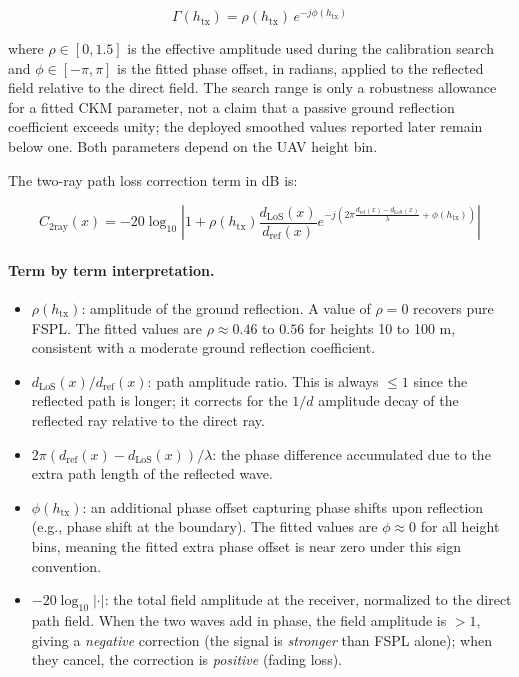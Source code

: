 \begin{equation}
\Gamma(h_{\mathrm{tx}})
=
\rho(h_{\mathrm{tx}})\,e^{-j\phi(h_{\mathrm{tx}})}
\end{equation}

where $\rho \in [0, 1.5]$ is the effective amplitude used during the
calibration search and $\phi \in [-\pi,\pi]$ is the fitted phase offset, in
radians, applied to the reflected field relative to the direct field.
The search range is only a robustness allowance for a fitted CKM parameter, not
a claim that a passive ground reflection coefficient exceeds unity; the
deployed smoothed values reported later remain below one.
Both parameters depend on the UAV height bin.

The two-ray path loss correction term in dB is:

\begin{equation}
C_{\mathrm{2ray}}(x)
=
-20 \log_{10}
\left|
1 + \rho(h_{\mathrm{tx}})
\frac{d_{\mathrm{LoS}}(x)}{d_{\mathrm{ref}}(x)}
e^{-j\left(2\pi\frac{d_{\mathrm{ref}}(x)-d_{\mathrm{LoS}}(x)}{\lambda}+\phi(h_{\mathrm{tx}})\right)}
\right|
\label{eq:c2ray}
\end{equation}

\paragraph{Term by term interpretation.}
\begin{itemize}
\item $\rho(h_{\mathrm{tx}})$: amplitude of the ground reflection. A value of
      $\rho = 0$ recovers pure FSPL. The fitted values are $\rho \approx
      0.46$ to $0.56$ for heights 10 to 100 m, consistent with a moderate
      ground reflection coefficient.
\item $d_{\mathrm{LoS}}(x)/d_{\mathrm{ref}}(x)$: path amplitude ratio. This
      is always $\le 1$ since the reflected path is longer; it corrects for
      the $1/d$ amplitude decay of the reflected ray relative to the direct
      ray.
\item \(2\pi(d_{\mathrm{ref}}(x)-d_{\mathrm{LoS}}(x))/\lambda\): the phase
      difference accumulated due to the extra path length of the reflected
      wave.
\item $\phi(h_{\mathrm{tx}})$: an additional phase offset capturing phase
      shifts upon reflection (e.g., phase shift at the boundary). The fitted
      values are $\phi \approx 0$ for all height bins, meaning the fitted
      extra phase offset is near zero under this sign convention.
\item $-20\log_{10}|\cdot|$: the total field amplitude at the receiver,
      normalized to the direct path field. When the two waves add in phase, the
      field amplitude is $> 1$, giving a \emph{negative} correction (the signal
      is \emph{stronger} than FSPL alone); when they cancel, the correction is
      \emph{positive} (fading loss).
\end{itemize}

